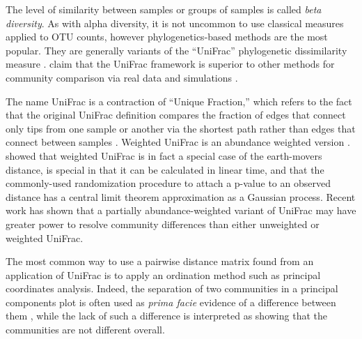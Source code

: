\documentclass{amsart}
\begin{document}
The level of similarity between samples or groups of samples is called \emph{beta diversity}.
As with alpha diversity, it is not uncommon to use classical measures \citep[e.g.][]{jaccard1908nouvelles} applied to OTU counts, however phylogenetics-based methods are the most popular.
They are generally variants of the ``UniFrac'' phylogenetic dissimilarity measure \citep[as described and named by][]{LozuponeKnightUniFrac05}.
\citet{kuczynski2010microbial} claim that the UniFrac framework is superior to other methods for community comparison via real data and simulations \citep[for a contrary viewpoint using simulations see][]{schloss2008evaluating}.

The name UniFrac is a contraction of ``Unique Fraction,'' which refers to the fact that the original UniFrac definition compares the fraction of edges that connect only tips from one sample or another via the shortest path rather than edges that connect between samples \citep{LozuponeKnightUniFrac05}.
Weighted UniFrac is an abundance weighted version \citep{LozuponeEaWeightedUnifrac07}.
\citet{evans2012phylogenetic} showed that weighted UniFrac is in fact a special case of the earth-movers distance, is special in that it can be calculated in linear time, and that the commonly-used randomization procedure to attach a p-value to an observed distance has a central limit theorem approximation as a Gaussian process.
Recent work \citep{chen2012associating} has shown that a partially abundance-weighted variant of UniFrac may have greater power to resolve community differences than either unweighted or weighted UniFrac.

The most common way to use a pairwise distance matrix found from an application of UniFrac is to apply an ordination method such as principal coordinates analysis.
Indeed, the separation of two communities in a principal components plot is often used as \emph{prima facie} evidence of a difference between them
\citep[e.g.][]{lozupone2007global,costello2009bacterial,yatsunenko2012human}, while the lack of such a difference is interpreted as showing that the communities are not different overall.
\end{document}

